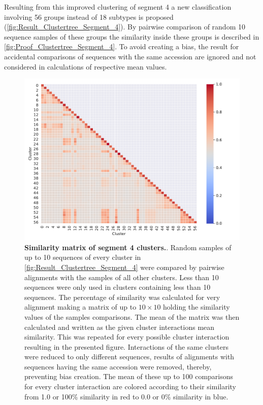 \vspace{1em}

Resulting from this improved clustering of segment 4 a new classification involving 56 groups instead of 18 subtypes is proposed (\autoref{fig:Result_Clustertree_Segment_4}). By pairwise comparison of random 10 sequence samples of these groups the similarity inside these groups is described in \autoref{fig:Proof_Clustertree_Segment_4}. To avoid creating a bias, the result for accidental comparisons of sequences with the same accession are ignored and not considered in calculations of respective mean values.

\begin{figure}[!hbt]
    \centering
    \includegraphics[width=\textwidth]{Results/Cluster_Difference_Segment_4.pdf}
    \caption[Similarity matrix of segment 4 clusters]{\textbf{Similarity matrix of segment 4 clusters.}. Random samples of up to 10 sequences of every cluster in \autoref{fig:Result_Clustertree_Segment_4} were compared by pairwise alignments with the samples of all other clusters. Less than 10 sequences were only used in clusters containing less than 10 sequences. The percentage of similarity was calculated for very alignment making a matrix of up to $10\times10$ holding the similarity values of the samples comparisons. The mean of the matrix was then calculated and written as the given cluster interactions mean similarity. This was repeated for every possible cluster interaction resulting in the presented figure. Interactions of the same clusters were reduced to only different sequences, results of alignments with sequences having the same accession were removed, thereby, preventing bias creation. The mean of these up to 100 comparisons for every cluster interaction are colored according to their similarity from 1.0 or 100\% similarity in red to 0.0 or 0\% similarity in blue.}
    \label{fig:Proof_Clustertree_Segment_4}
\end{figure}

